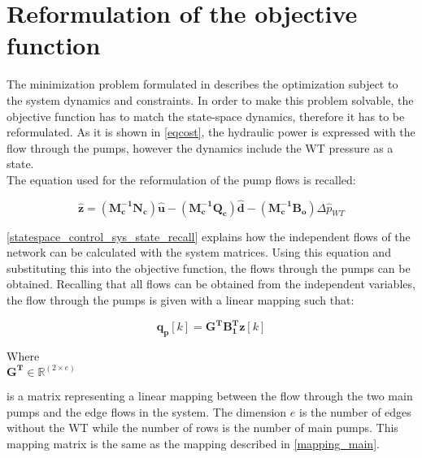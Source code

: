 \section{Reformulation of the objective function}
\label{ObjFunc_reform}

The minimization problem formulated in  describes the optimization subject to the system dynamics and constraints. In order to make this problem solvable, the objective function has to match the state-space dynamics, therefore it has to be reformulated. As it is shown in \eqref{eqcost}, the hydraulic power is expressed with the flow through the pumps, however the dynamics include the WT pressure as a state. 
\\
\newline
The equation used for the reformulation of the pump flows is recalled:

 \begin{equation}
 \bm{\hat{z}} =   (\bm{M_c^{-1}}\bm{N_c}) \bm{\hat{u}} - (\bm{M_c^{-1}}\bm{Q_c}) \bm{\hat{d}} - (\bm{M_c^{-1}}\bm{B_o}) \Delta \hat{p}_{WT}    
 \label{statespace_control_sys_state_recall}
\end{equation}

\eqref{statespace_control_sys_state_recall} explains how the independent flows of the network can be calculated with the system matrices. Using this equation and substituting  this into the objective function, the flows through the pumps can be obtained. Recalling that all flows can be obtained from the independent variables, the flow through the pumps is given with a linear mapping such that: 

\begin{equation}
\bm{q_p}[k]  = \bm{G^T} \bm{B_{1}^T}  \bm{z}[k]
\label{mapping_mainP}
\end{equation}

\begin{minipage}[t]{0.20\textwidth}
Where\\
\hspace*{8mm} $\bm{G^T} \in \bm{\mathbb{R}}^{(2 \times e)} $ 
\end{minipage}
\begin{minipage}[t]{0.78\textwidth}
\vspace*{2mm}
is a matrix representing a linear mapping between the flow through the two main pumps and the edge flows in the system. The dimension $e$ is the number of edges without the WT while the number of rows is the number of main pumps. This mapping matrix is the same as the mapping described in \eqref{mapping_main}.
\end{minipage} 

